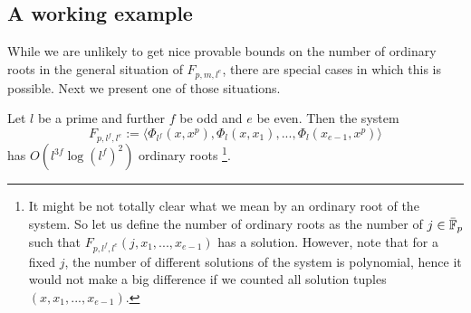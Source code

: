 \subsection{A working example}
While we are unlikely to get nice provable bounds on the number of ordinary roots in the general situation of $F_{p, m, l^e}$, there are special cases in which this is possible.
Next we present one of those situations.
\begin{prop}
    Let $l$ be a prime and further $f$ be odd and $e$ be even.
    Then the system
    \begin{equation*}
        F_{p, l^f, l^e} := \langle \Phi_{l^f}(x, x^p), \Phi_l(x, x_1), ..., \Phi_l(x_{e - 1}, x^p) \rangle
    \end{equation*}
    has $O(l^{3f}\log(l^f)^2)$ ordinary roots
    \footnote{It might be not totally clear what we mean by an ordinary root of the system.
    So let us define the number of ordinary roots as the number of $j \in \bar{\mathbb{F}}_p$ such that $F_{p, l^f, l^e}(j, x_1, ..., x_{e - 1})$ has a solution.
    However, note that for a fixed $j$, the number of different solutions of the system is polynomial, hence it would not make a big difference if we counted all solution tuples $(x, x_1, ..., x_{e - 1})$.}.
\end{prop}
